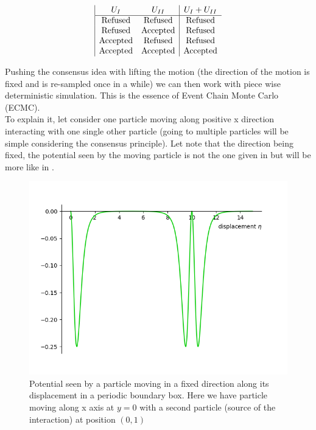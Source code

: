 \documentclass[jcp,twocolumn,longbibliography,superscriptaddress]{revtex4-2}
\begin{document}
	\begin{displaymath}
		\begin{array}{|c c|c}
			U_I & U_{II} & U_I + U_{II}\\
			\hline
			\text{Refused} & \text{Refused} & \text{Refused}\\
			\text{Refused} & \text{Accepted} & \text{Refused}\\
			\text{Accepted} & \text{Refused} & \text{Refused}\\
			\text{Accepted} & \text{Accepted} & \text{Accepted}
		\end{array}
	\end{displaymath}
	
	Pushing the consensus idea with lifting the motion (the direction of the motion is fixed and is re-sampled once in a while) we can then work with piece wise deterministic simulation. This is the essence of Event Chain Monte Carlo (ECMC). \\
	To explain  it, let consider one particle moving along positive x direction interacting with one single other particle (going to multiple particles will be simple considering the consensus principle). Let note that the direction being fixed, the potential seen by the moving particle is not the one given in  but will be more like in  .
	
	\begin{figure}[htb]
		\centering
		\includegraphics[width=\columnwidth]{./Figures/LJ_seen.png}
		\caption{Potential seen by a particle moving in a fixed direction along its displacement in a periodic boundary box. Here we have particle moving along x axis at $y=0$ with a second particle (source of the interaction)  at position $(0,1)$}
		\label{LennardJonesseen}
	\end{figure}
	
\end{document}
